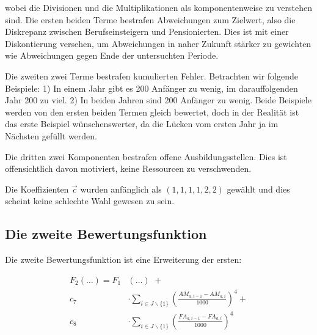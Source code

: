 \documentclass[a4paper,12pt]{article}
\begin{document}
wobei die Divisionen und die Multiplikationen als komponentenweise zu verstehen sind. Die ersten beiden Terme bestrafen Abweichungen zum Zielwert, also die Diskrepanz zwischen Berufseinsteigern und Pensionierten. Dies ist mit einer Diskontierung versehen, um Abweichungen in naher Zukunft stärker zu gewichten wie Abweichungen gegen Ende der untersuchten Periode. 

Die zweiten zwei Terme bestrafen kumulierten Fehler. Betrachten wir folgende Beispiele: 1) In einem Jahr gibt es 200 Anfänger zu wenig, im darauffolgenden Jahr 200 zu viel. 2) In beiden Jahren sind 200 Anfänger zu wenig. Beide Beispiele werden von den ersten beiden Termen gleich bewertet, doch in der Realität ist das erste Beispiel wünschenswerter, da die Lücken vom ersten Jahr ja im Nächsten gefüllt werden. 

Die dritten zwei Komponenten bestrafen offene Ausbildungsstellen. Dies ist offensichtlich davon motiviert, keine Ressourcen zu verschwenden.

Die Koeffizienten $\vec c$ wurden anfänglich als $(1,1,1,1,2,2)$ gewählt und dies scheint keine schlechte Wahl gewesen zu sein.

%
%
%

\subsection{Die zweite Bewertungsfunktion}

Die zweite Bewertungsfunktion ist eine Erweiterung der ersten:

\begin{align*}
F_2(\hdots) =	F_1&(\hdots) \hspace{4pt} + \\
			c_7 &\cdot \sum\limits_{i\in J\backslash\{1\}} \left( \frac{AM_{a,i-1} - AM_{a,i} }{1000} \right) ^ 4 + \\
			c_8 &\cdot \sum\limits_{i\in J\backslash\{1\}} \left( \frac{FA_{a,i-1} - FA_{a,i} }{1000} \right) ^ 4
\end{align*}
\end{document}
